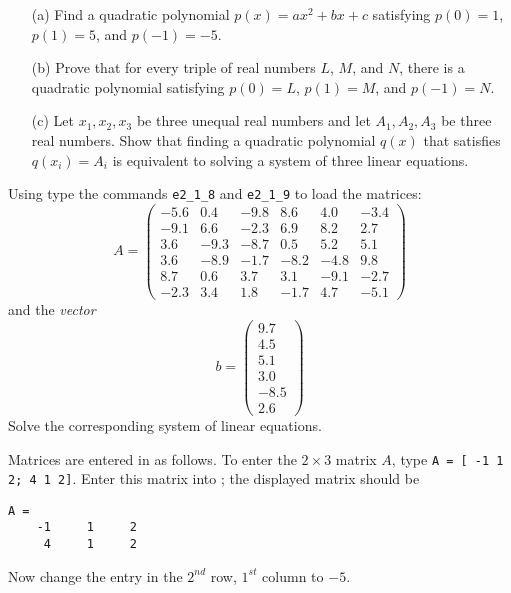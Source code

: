 \documentclass{ximera}
\begin{document}
\begin{exercise} \label{c2.1.11}
\begin{itemize}
\item[(a)] Find a quadratic polynomial $p(x) = ax^2 + bx + c$
satisfying $p(0) = 1$, $p(1) = 5$, and $p(-1) = -5$.
\item[(b)] Prove that for every triple of real numbers $L$, $M$,
and $N$, there is a quadratic polynomial satisfying $p(0) = L$,
$p(1) = M$, and $p(-1) = N$.
\item[(c)] Let $x_1,x_2,x_3$ be three unequal real
numbers and let $A_1,A_2,A_3$ be three real numbers.  Show
that finding a quadratic polynomial $q(x)$ that satisfies
$q(x_i) = A_i$ is equivalent to solving a system of three
linear equations.
\end{itemize}
\end{exercise}

\CEXER

\begin{exercise} \label{c2.1.1}
Using \Matlab type the commands {\tt e2\_1\_8} and {\tt e2\_1\_9}
to load the matrices:
\begin{equation*}
A = \left(
\begin{array}{rrrrrr}
   -5.6 &  0.4 & -9.8 &  8.6 &  4.0 & -3.4\\
   -9.1 &  6.6 & -2.3 &  6.9 &  8.2 &  2.7\\
    3.6 & -9.3 & -8.7 &  0.5 &  5.2 &  5.1\\
    3.6 & -8.9 & -1.7 & -8.2 & -4.8 &  9.8\\
    8.7 &  0.6 &  3.7 &  3.1 & -9.1 & -2.7\\
   -2.3 &  3.4 &  1.8 & -1.7 &  4.7 & -5.1
\end{array}
\right)
\end{equation*}
and the {\em vector\/}
\begin{equation*}
b = \left(
\begin{array}{r}
    9.7\\
    4.5\\
    5.1\\
    3.0\\
   -8.5\\
    2.6
\end{array}
\right)
\end{equation*}
Solve the corresponding system of linear equations.
\end{exercise}

\begin{exercise} \label{c2.1.2}
Matrices are entered in \Matlab as follows. To enter
the $2\times 3$ matrix $A$, type {\tt A = [ -1 1 2; 4 1 2]}.
Enter this matrix into \Matlabp; the displayed matrix should be
\begin{verbatim}
A =
    -1     1     2
     4     1     2
\end{verbatim}
Now change the entry in the $2^{nd}$ row, $1^{st}$ column to
$-5$.
\end{exercise}
\end{document}
